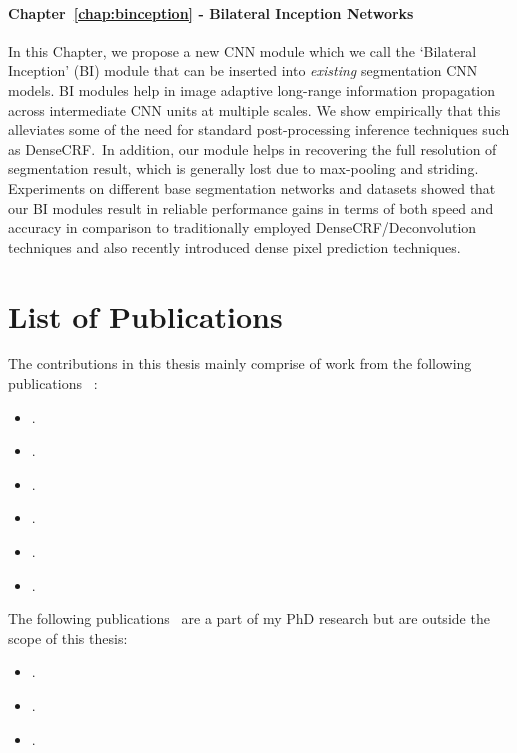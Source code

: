 \paragraph{Chapter~\ref{chap:binception} - Bilateral Inception Networks}
In this Chapter, we propose a new CNN module which we call the `Bilateral Inception' (BI)
module that can be inserted into \emph{existing} segmentation CNN models. BI modules help in image adaptive
long-range information propagation across intermediate CNN units at multiple scales.
We show empirically that this alleviates some of the need for standard post-processing inference
techniques such as DenseCRF.~In addition, our module helps in recovering the full resolution of segmentation result,
which is generally lost due to max-pooling and striding. Experiments on different base
segmentation networks and datasets showed that our BI modules result in
reliable performance gains in terms of both speed and accuracy in comparison to traditionally
employed DenseCRF/Deconvolution techniques and also recently introduced dense pixel prediction techniques.

\section{List of Publications}

\nobibliography*

The contributions in this thesis mainly comprise of work from the following publications
~\cite{jampani2014,jampani15aistats,kiefel15bnn,arxivpaper,gadde16bilateralinception,
jampani16vpn}:

\begin{itemize}

\item {}.~\cite{jampani2014}
\item {}.~\cite{jampani15aistats}
\item {}.~\cite{kiefel15bnn}
\item {}.~\cite{arxivpaper}
\item {}.~\cite{gadde16bilateralinception}
\item {}.~\cite{jampani16vpn}

\end{itemize}

The following publications~\cite{jampani15wacv,jampani15wacv,gadde2016efficient}
are a part of my PhD research but are outside the scope of this thesis:

\begin{itemize}

\item {}.~\cite{jampani15wacv}
\item {}.~\cite{sevilla:CVPR:2016}
\item {}.~\cite{gadde2016efficient}

\end{itemize}
